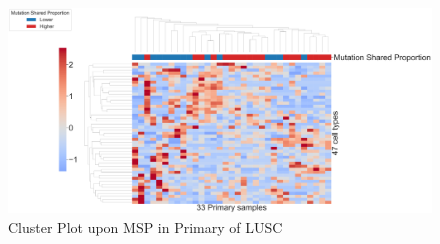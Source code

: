 \documentclass{beamer}
\begin{document}
\begin{frame}[allowframebreaks]
        \begin{figure}
            \includegraphics[width=0.9 \linewidth]{figures/BisqueRNA/clustermap/STAR.FPKM.GSE131907.SQC.MSP-median/Mutation Shared Proportion-Primary.pdf}
            \caption{Cluster Plot upon MSP in Primary of LUSC}
        \end{figure}
    \end{frame}
\end{document}
